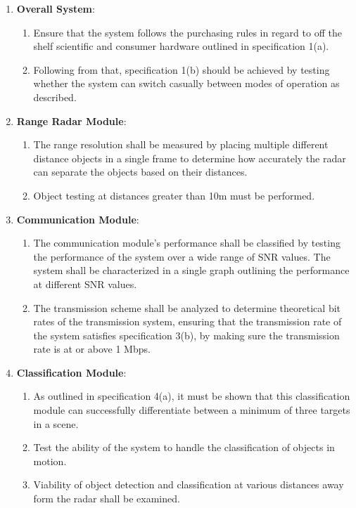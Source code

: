 \documentclass[11pt]{report}
\begin{document}
\begin{enumerate}
    \item \textbf{Overall System}:
    \begin{enumerate}
        \item Ensure that the system follows the purchasing rules in regard to off the shelf scientific and consumer hardware outlined in specification 1(a).
        \item Following from that, specification 1(b) should be achieved by testing whether the system can switch casually between modes of operation as described.
    \end{enumerate}
    \item \textbf{Range Radar Module}:
    \begin{enumerate}
        \item The range resolution shall be measured by placing multiple different distance objects in a single frame to determine how accurately the radar can separate the objects based on their distances.
        \item Object testing at distances greater than 10m must be performed.
    \end{enumerate}
    \item \textbf{Communication Module}:
    \begin{enumerate}
        \item The communication module's performance shall be classified by testing the performance of the system over a wide range of SNR values. The system shall be characterized in a single graph outlining the performance at different SNR values.
        \item The transmission scheme shall be analyzed to determine theoretical bit rates of the transmission system, ensuring that the transmission rate of the system satisfies specification 3(b), by making sure the transmission rate is at or above 1 Mbps.
    \end{enumerate}
    \item \textbf{Classification Module}:
    \begin{enumerate}
        \item As outlined in specification 4(a), it must be shown that this classification module can successfully differentiate between a minimum of three targets in a scene.
        \item Test the ability of the system to handle the classification of objects in motion.
        \item Viability of object detection and classification at various distances away form the radar shall be examined.
    \end{enumerate}
\end{enumerate}
\end{document}
